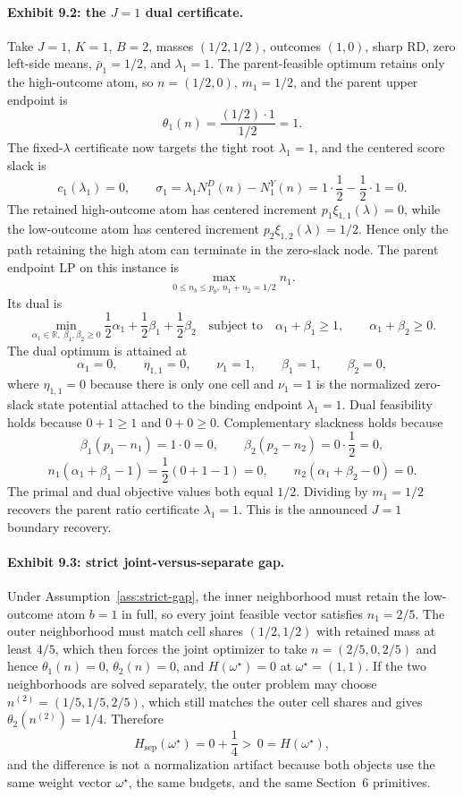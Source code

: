 \documentclass[11pt]{article}
\newcommand{\R}{\mathbb{R}}
\theoremstyle{definition}
\theoremstyle{plain}
\theoremstyle{remark}
\begin{document}
\paragraph{Exhibit 9.2: the \(J=1\) dual certificate.}
Take \(J=1\), \(K=1\), \(B=2\), masses \((1/2,1/2)\), outcomes \((1,0)\), sharp RD, zero
left-side means, \(\bar\rho_1=1/2\), and \(\lambda_1=1\). The parent-feasible optimum retains
only the high-outcome atom, so \(n=(1/2,0)\), \(m_1=1/2\), and the parent upper endpoint is
\[
  \theta_1(n)=\frac{(1/2)\cdot 1}{1/2}=1.
\]
The fixed-\(\lambda\) certificate now targets the tight root \(\lambda_1=1\), and the centered
score slack is
\[
  c_1(\lambda_1)=0,\qquad
  \sigma_1=\lambda_1 N_1^D(n)-N_1^Y(n)
  =1\cdot \frac12-\frac12\cdot 1=0.
\]
The retained high-outcome atom has centered increment \(p_1\xi_{1,1}(\lambda)=0\), while the
low-outcome atom has centered increment \(p_2\xi_{1,2}(\lambda)=1/2\). Hence only the path
retaining the high atom can terminate in the zero-slack node. The parent endpoint LP on this
instance is
\[
  \max_{0\le n_b\le p_b,\ n_1+n_2=1/2} n_1.
\]
Its dual is
\[
  \min_{\alpha_1\in\R,\ \beta_1,\beta_2\ge 0}
  \frac12\alpha_1+\frac12\beta_1+\frac12\beta_2
  \quad\text{subject to}\quad
  \alpha_1+\beta_1\ge 1,\qquad
  \alpha_1+\beta_2\ge 0.
\]
The dual optimum is attained at
\[
  \alpha_1=0,\qquad \eta_{1,1}=0,\qquad \nu_1=1,\qquad \beta_1=1,\qquad \beta_2=0,
\]
where \(\eta_{1,1}=0\) because there is only one cell and \(\nu_1=1\) is the normalized
zero-slack state potential attached to the binding endpoint \(\lambda_1=1\). Dual feasibility
holds because \(0+1\ge 1\) and \(0+0\ge 0\). Complementary slackness holds because
\[
  \beta_1(p_1-n_1)=1\cdot 0=0,\qquad
  \beta_2(p_2-n_2)=0\cdot \frac12=0,
\]
\[
  n_1(\alpha_1+\beta_1-1)=\frac12(0+1-1)=0,\qquad
  n_2(\alpha_1+\beta_2-0)=0.
\]
The primal and dual objective values both equal \(1/2\). Dividing by \(m_1=1/2\) recovers the
parent ratio certificate \(\lambda_1=1\). This is the announced \(J=1\) boundary recovery.

\paragraph{Exhibit 9.3: strict joint-versus-separate gap.}
Under Assumption~\ref{ass:strict-gap}, the inner neighborhood must retain the low-outcome atom
\(b=1\) in full, so every joint feasible vector satisfies \(n_1=2/5\). The outer neighborhood
must match cell shares \((1/2,1/2)\) with retained mass at least \(4/5\), which then forces the
joint optimizer to take \(n=(2/5,0,2/5)\) and hence \(\theta_1(n)=0\), \(\theta_2(n)=0\), and
\(H(\omega^\star)=0\) at \(\omega^\star=(1,1)\). If the two neighborhoods are solved separately,
the outer problem may choose \(n^{(2)}=(1/5,1/5,2/5)\), which still matches the outer cell
shares and gives \(\theta_2(n^{(2)})=1/4\). Therefore
\[
  H_{\mathrm{sep}}(\omega^\star)=0+\frac14>\,0=H(\omega^\star),
\]
and the difference is not a normalization artifact because both objects use the same weight
vector \(\omega^\star\), the same budgets, and the same Section~6 primitives.
\end{document}
